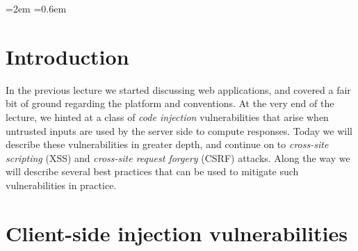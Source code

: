 \documentclass[11pt,twoside]{scrartcl}
\begin{document}
\newcommand{\atrace}{\omega}%
\newcommand{\stdI}{\dTLint[state=\omega]}%
\newcommand{\Ip}{\dTLint[trace=\atrace]}%
\newcommand{\ws}{\omega}\newcommand{\wt}{\nu}%

\newdimen{\linferenceRulehskipamount}
\linferenceRulehskipamount=2em
  \linferenceRulevskipamount=0.6em


\lstset{escapechar=@,style=customc}

\maketitle
\thispagestyle{empty}


\section{Introduction}

In the previous lecture we started discussing web applications, and covered a fair bit of ground regarding the platform and conventions. At the very end of the lecture, we hinted at a class of \emph{code injection} vulnerabilities that arise when untrusted inputs are used by the server side to compute responses. Today we will describe these vulnerabilities in greater depth, and continue on to \emph{cross-site scripting} (XSS) and \emph{cross-site request forgery} (CSRF) attacks. Along the way we will describe several best practices that can be used to mitigate such vulnerabilities in practice.

\section{Client-side injection vulnerabilities}
\end{document}
